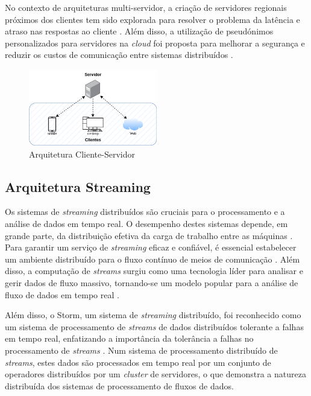 No contexto de arquiteturas multi-servidor, a criação de servidores regionais próximos dos clientes 
tem sido explorada para resolver o problema da latência e atraso nas respostas ao cliente 
\cite{clientserver2022b}. Além disso, a utilização de pseudónimos personalizados para servidores 
na \textit{cloud} foi proposta para melhorar a segurança e reduzir os custos de comunicação entre
sistemas distribuídos \cite{clientserver2017}.

\begin{figure}[H]
    \centering
    \includegraphics[width=0.5\textwidth]{media/content/estado-arte/client-server.png}
    \caption{Arquitetura Cliente-Servidor}
    \label{fig:client-server}
\end{figure}

\subsection{Arquitetura Streaming}

Os sistemas de \textit{streaming} distribuídos são cruciais para o processamento e a análise de dados 
em tempo real. O desempenho destes sistemas depende, em grande parte, da distribuição efetiva da 
carga de trabalho entre as máquinas \cite{stream2020}. Para garantir um serviço de \textit{streaming} 
eficaz e confiável, é essencial estabelecer um ambiente distribuído para o fluxo contínuo de 
meios de comunicação \cite{stream2014}. Além disso, a computação de \textit{streams} surgiu como 
uma tecnologia líder para analisar e gerir dados de fluxo massivo, tornando-se um modelo popular
para a análise de fluxo de dados em tempo real \cite{stream2018} \cite{stream2018b}.

Além disso, o Storm, um sistema de \textit{streaming} distribuído, foi reconhecido como um sistema de 
processamento de \textit{streams} de dados distribuídos tolerante a falhas em tempo real, enfatizando
a importância da tolerância a falhas no processamento de \textit{streams} \cite{stormattwitter}.
Num sistema de processamento distribuído de \textit{streams}, estes dados são processados em tempo real 
por um conjunto de operadores distribuídos por um \textit{cluster} de servidores, o que demonstra a 
natureza distribuída dos sistemas de processamento de fluxos de dados.

